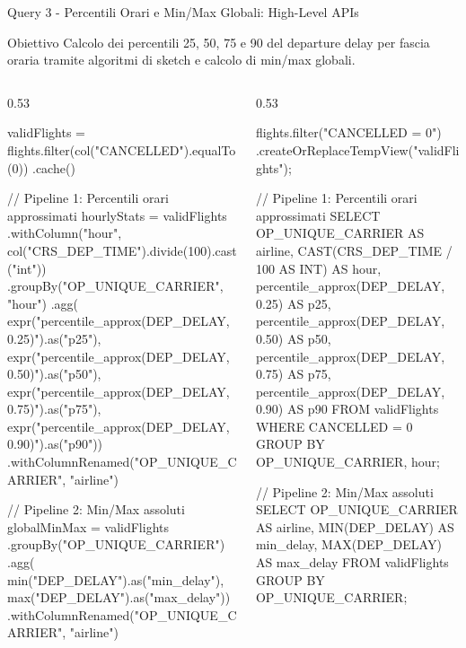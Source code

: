 \documentclass[10pt, aspectratio=169]{beamer}
\newcommand{\queryobjective}[1]{
    \vspace{-0.5cm}
    \begin{exampleblock}{\footnotesize Obiettivo}
    \scriptsize #1
    \end{exampleblock}
    \vfill
}
\begin{document}
\begin{frame}[fragile, t]{Query 3 - Percentili Orari e Min/Max Globali: High-Level APIs}

    \queryobjective{Calcolo dei percentili 25, 50, 75 e 90 del departure delay per fascia oraria tramite algoritmi di sketch e calcolo di min/max globali.}

    \begin{columns}[c]

        \begin{column}{0.53\textwidth}
            \begin{dataframecodebox}
validFlights = flights.filter(col("CANCELLED").equalTo(0))
                        .cache()

// Pipeline 1: Percentili orari approssimati
hourlyStats = validFlights
  .withColumn("hour",
    col("CRS_DEP_TIME").divide(100).cast("int"))
  .groupBy("OP_UNIQUE_CARRIER", "hour")
  .agg(
    expr("percentile_approx(DEP_DELAY, 0.25)").as("p25"),
    expr("percentile_approx(DEP_DELAY, 0.50)").as("p50"),
    expr("percentile_approx(DEP_DELAY, 0.75)").as("p75"),
    expr("percentile_approx(DEP_DELAY, 0.90)").as("p90"))
  .withColumnRenamed("OP_UNIQUE_CARRIER", "airline")

// Pipeline 2: Min/Max assoluti
globalMinMax = validFlights
  .groupBy("OP_UNIQUE_CARRIER")
  .agg(
    min("DEP_DELAY").as("min_delay"),
    max("DEP_DELAY").as("max_delay"))
  .withColumnRenamed("OP_UNIQUE_CARRIER", "airline")
            \end{dataframecodebox}
        \end{column}

        \hfill

        \begin{column}{0.53\textwidth}
            \begin{sqlcodebox}
flights.filter("CANCELLED = 0")
        .createOrReplaceTempView("validFlights");

// Pipeline 1: Percentili orari approssimati
SELECT
  OP_UNIQUE_CARRIER AS airline,
  CAST(CRS_DEP_TIME / 100 AS INT) AS hour,
  percentile_approx(DEP_DELAY, 0.25) AS p25,
  percentile_approx(DEP_DELAY, 0.50) AS p50,
  percentile_approx(DEP_DELAY, 0.75) AS p75,
  percentile_approx(DEP_DELAY, 0.90) AS p90
FROM validFlights
WHERE CANCELLED = 0
GROUP BY OP_UNIQUE_CARRIER, hour;

// Pipeline 2: Min/Max assoluti
SELECT
  OP_UNIQUE_CARRIER AS airline,
  MIN(DEP_DELAY) AS min_delay,
  MAX(DEP_DELAY) AS max_delay
FROM validFlights
GROUP BY OP_UNIQUE_CARRIER;
            \end{sqlcodebox}
        \end{column}

    \end{columns}

\end{frame}
\end{document}
